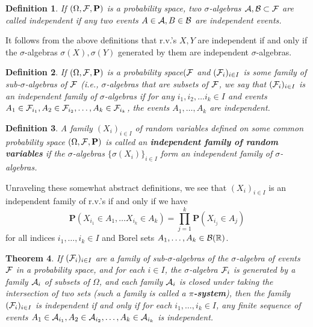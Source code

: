 \documentclass[12pt]{article}
\newtheorem{thm}{Theorem}[section]
\newtheorem{defi}[thm]{Definition}
\newcommand{\R}{\mathbb{R}}
\newcommand{\prob}{\mathbf{P}}
\theoremstyle{example}
\begin{document}
\begin{defi}
If $(\Omega, {\cal F}, \prob)$ is a probability space, two $\sigma$-algebras ${\cal A}, {\cal B}\subset {\cal F}$ are called independent if any two events $A\in {\cal A}, B\in{\cal B}$ are independent events.
\end{defi}

It follows from the above definitions that r.v.'s $X,Y$ are independent if and only if the $\sigma$-algebras $\sigma(X), \sigma(Y)$ generated by them are independent $\sigma$-algebras.

\begin{defi} If $(\Omega, {\cal F}, \prob)$ is a probability space$({\cal F}$ and $({\cal F}_i)_{i\in I}$ is some family of sub-$\sigma$-algebras of ${\cal F}$ (i.e., $\sigma$-algebras that are subsets of ${\cal F}$, we say that $({\cal F}_i)_{i\in I}$ is an independent family of $\sigma$-algebras if for any $i_1,i_2,\ldots i_k\in I$ and events $A_1 \in {\cal F}_{i_1}, A_2 \in {\cal F}_{i_2}, \ldots, A_k \in {\cal F}_{i_k}$, the events $A_1,\ldots,A_k$ are independent.
\end{defi}

\begin{defi} A family $(X_i)_{i\in I}$ of random variables defined on some common probability space $(\Omega, {\cal F}, \prob)$ is called an \textbf{independent family of random variables} if the $\sigma$-algebras $\{ \sigma(X_i) \}_{i\in I}$ form an independent family of $\sigma$-algebras.
\end{defi}

Unraveling these somewhat abstract definitions, we see that $(X_i)_{i\in I}$ is an independent family of r.v.'s if and only if we have
$$ \prob(X_{i_1} \in A_1, \ldots X_{i_k} \in A_k) = \prod_{j=1}^k \prob(X_{i_j} \in A_j) $$
for all indices $i_1,\ldots,i_k \in I$ and Borel sets $A_1,\ldots, A_k \in {\cal B}(\R)$.

\begin{thm} If $({\cal F}_i)_{i\in I}$ are a family of sub-$\sigma$-algebras of the $\sigma$-algebra of events ${\cal F}$ in a probability space, and for each $i\in I$, the $\sigma$-algebra ${\cal F}_i$ is generated by a family ${\cal A}_i$ of subsets of $\Omega$, and each family ${\cal A}_i$ is closed under taking the intersection of two sets (such a family is called a \textbf{$\pi$-system}), then the family $({\cal F}_i)_{i\in I}$ is independent if and only if for each $i_1,\ldots,i_k\in I$, any finite sequence of events $A_1 \in {\cal A}_{i_1}, A_2\in {\cal A}_{i_2}, \ldots, A_k \in {\cal A}_{i_k}$ is independent.
\end{thm}
\end{document}
